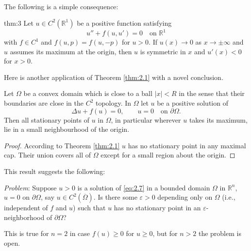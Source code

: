 The following is a simple consequence:


\begin{theorempp}{thm:3}
  Let $u\in C^2(\mathbb{R}^1)$ be a positive function satisfying
  \[u'' + f(u,u') = 0\quad\text{on } \mathbb{R}^1\]
  with $f\in C^1$ and $f(u,p) = f(u,-p)$ for $u>0$.
  If $u(x)\to 0$ as $x\to \pm\infty$ and $u$ assumes its maximum at the origin,
  then $u$ is symmetric in $x$ and $u'(x)<0$ for $x>0$.
\end{theorempp}

 Here is another application of Theorem \ref{thm:2.1} with a novel conclusion.

\begin{corollary}\label{cor:3}
  Let $\Omega$ be a convex domain which is close to a ball $|x|<R$
  in the sense that their boundaries are close in the $C^2$ topology.
  In $\Omega$ let $u$ be a positive solution of
  \begin{equation}\label{eq:2.7}
    \Delta u + f(u) = 0,\qquad u=0\quad \text{on }\partial\Omega.
  \end{equation}
  Then all stationary points of $u$ in $\Omega$, in particular wherever $u$ takes its maximum,
  lie in a small neighbourhood of the origin.
\end{corollary}

\begin{proof}
  According to Theorem \ref{thm:2.1} $u$ has no stationary point in any maximal cap.
  Their union covers all of $\Omega$ except for a small region about the origin.
\end{proof}

This result suggests the following:
\medskip

\noindent
\textit{Problem}: Suppose $u>0$ is a solution of \eqref{eq:2.7}
in a bounded domain $\Omega$ in $\mathbb{R}^n$, $u=0$ on $\partial\Omega$,
say $u\in C^2(\overline{\Omega})$. Is there some $\varepsilon>0$
depending only on $\Omega$ (i.e., independent of $f$ and $u$) such that
$u$ has no stationary point in an $\varepsilon$-neighborhood of $\partial\Omega$?

This is true for $n=2$ in case $f(u)\geq 0$ for $u\geq 0$,
but for $n>2$ the problem is open.

